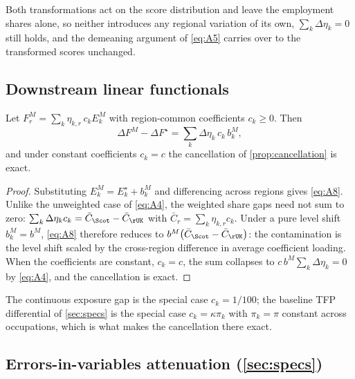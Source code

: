 Both transformations act on the score distribution and leave the employment shares alone, so neither introduces any regional variation of its own, $\sum_k \Delta\eta_k = 0$ still holds, and the demeaning argument of \cref{eq:A5} carries over to the transformed scores unchanged.

\subsection{Downstream linear functionals}

\begin{corollary}\label{cor:functionals}
Let $F^{M}_r = \sum_k \eta_{k,r}\, c_k E^{M}_k$ with region-common coefficients $c_k \ge 0$. Then
\begin{equation}\label{eq:A8}
\Delta F^{M} - \Delta F^{\star}
= \sum_k \Delta\eta_k\, c_k\, b^{M}_k ,
\end{equation}
and under constant coefficients $c_k = c$ the cancellation of \cref{prop:cancellation} is exact.
\end{corollary}

\begin{proof}
Substituting $E^{M}_k = E^{\star}_k + b^{M}_k$ and differencing across regions gives \cref{eq:A8}. Unlike the unweighted case of \cref{eq:A4}, the weighted share gaps need not sum to zero: $\sum_k \Delta\eta_k c_k = \bar{C}_{\Scot} - \bar{C}_{\rUK}$ with $\bar{C}_r = \sum_k \eta_{k,r} c_k$. Under a pure level shift $b^{M}_k = b^{M}$, \cref{eq:A8} therefore reduces to $b^{M} \bigl(\bar{C}_{\Scot} - \bar{C}_{\rUK}\bigr)$: the contamination is the level shift scaled by the cross-region difference in average coefficient loading. When the coefficients are constant, $c_k = c$, the sum collapses to $c\, b^{M} \sum_k \Delta\eta_k = 0$ by \cref{eq:A4}, and the cancellation is exact.
\end{proof}

\noindent
The continuous exposure gap is the special case $c_k = 1/100$; the baseline TFP differential of \cref{sec:specs} is the special case $c_k = \kappa \pi_k$ with $\pi_k = \pi$ constant across occupations, which is what makes the cancellation there exact.

\subsection{Errors-in-variables attenuation (\texorpdfstring{\cref{sec:specs}}{Section 4.4})}

